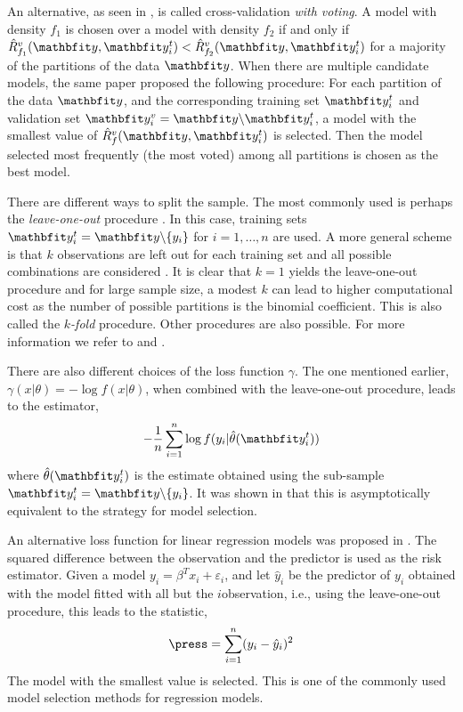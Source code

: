 An alternative, as seen in \cite{Yang:2007vx}, is called cross-validation
\emph{with voting}. A model with density $f_1$ is chosen over a model with
density $f_2$ if and only if $\hat{R}_{f_1}^v(\data,\data_i^t) <
\hat{R}_{f_2}^v(\data,\data_i^t)$ for a majority of the partitions of the
data $\data$. When there are multiple candidate models, the same paper
proposed the following procedure: For each partition of the data $\data$, and
the corresponding training set $\data_i^t$ and validation set $\data_i^v =
\data\backslash\data_i^t$, a model with the smallest value of
$\hat{R}_f^v(\data,\data_i^t)$ is selected. Then the model selected most
frequently (the most voted) among all partitions is chosen as the best model.

There are different ways to split the sample. The most commonly used is
perhaps the \emph{leave-one-out} procedure
\cite{Stone:1974vx,Geisser:1975vx}. In this case, training sets $\data_i^t =
\data\backslash\{y_i\}$ for $i = 1,\dots,n$ are used. A more general scheme
is that $k$ observations are left out for each training set and all possible
combinations are considered \cite{Shao:1993vx}. It is clear that $k=1$ yields
the leave-one-out procedure and for large sample size, a modest $k$ can lead
to higher computational cost as the number of possible partitions is the
binomial coefficient. This is also called the $k$\emph{-fold} procedure.
Other procedures are also possible. For more information we refer to
\cite{Stone:1978vx} and \cite{Hjorth:1994vx}.

There are also different choices of the loss function $\gamma$. The one
mentioned earlier, $\gamma(x|\theta) = -\log f(x|\theta)$, when combined with
the leave-one-out procedure, leads to the estimator,
\begin{equation}
  -\frac{1}{n}\sum_{i=1}^n\log f(y_i|\hat\theta(\data_i^t))
\end{equation}
where $\hat\theta(\data_i^t)$ is the estimate obtained using the sub-sample
$\data_i^t = \data\backslash\{y_i\}$. It was shown in \cite{Stone:1978vx} that
this is asymptotically equivalent to the \aic strategy for model selection.

An alternative loss function for linear regression models was proposed in
\cite{Allen:1974vx}. The squared difference between the observation and the
predictor is used as the risk estimator. Given a model $y_i = \beta^T x_i +
\varepsilon_i$, and let $\hat{y}_i$ be the predictor of $y_i$ obtained with
the model fitted with all but the $i$\xth observation, i.e., using the
leave-one-out procedure, this leads to the \press statistic,
\begin{equation}
  \press = \sum_{i=1}^n(y_i - \hat{y}_i)^2
\end{equation}
The model with the smallest \press value is selected. This is one of the
commonly used model selection methods for regression models.

